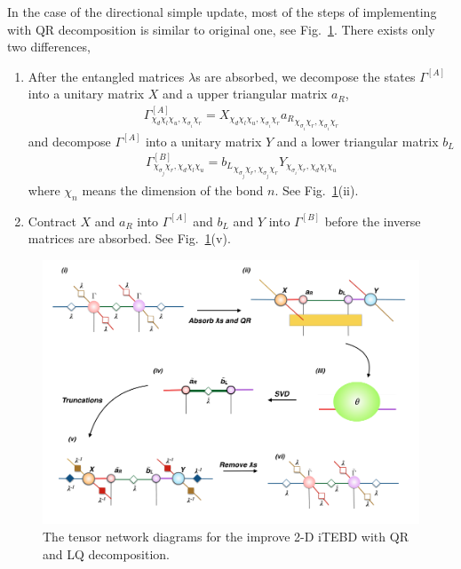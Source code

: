 In the case of the directional simple update, most of the steps of implementing with QR decomposition is similar to original one, see Fig.~\ref{fig319}. There exists only two differences, 
\begin{enumerate}
	\item After the entangled matrices $\lambda$s are absorbed, we decompose the states $\Gamma^{[A]}$ into a unitary matrix $X$ and a upper triangular matrix $a_R$,
		\begin{align}
			\Gamma^{[A]}_{\chi_d \chi_l \chi_u, \chi_{\sigma_i} \chi_r} = X_{\chi_d \chi_l \chi_u, \chi_{\sigma_i} \chi_r} {a_R}_{\chi_{\sigma_i} \chi_r,\chi_{\sigma_i} \chi_r}
		\end{align}
		and decompose $\Gamma^{[A]}$ into a unitary matrix $Y$ and a lower triangular matrix $b_L$
		\begin{align}
			\Gamma^{[B]}_{\chi_{\sigma_j} \chi_r, \chi_d \chi_l \chi_u} = {b_L}_{\chi_{\sigma_j} \chi_r,\chi_{\sigma_j} \chi_r} Y_{\chi_{\sigma_i} \chi_r, \chi_d \chi_l \chi_u} 
		\end{align}
		where $\chi_n$ means the dimension of the bond $n$. See Fig.~\ref{fig319}(ii).
	\item Contract $X$ and $a_R$ into $\Gamma^{[A]}$ and $b_L$ and $Y$ into $\Gamma^{[B]}$ before the inverse matrices are absorbed. See Fig.~\ref{fig319}(v).

\end{enumerate}
\begin{figure}[H] 
	\centering 
	\includegraphics[width=1.00\textwidth]{figures/fig318.png} 
	\caption[The tensor network diagrams for the improve 2-D iTEBD with QR decomposition]{The tensor network diagrams for the improve 2-D iTEBD with QR and LQ decomposition.} 
	\label{fig319} 
\end{figure} 

